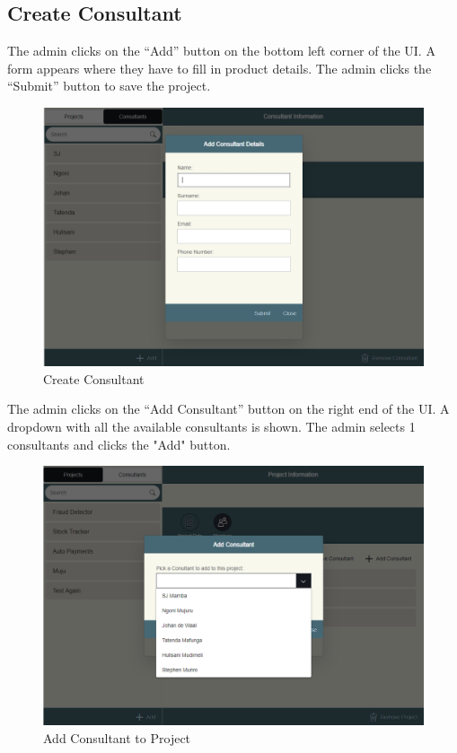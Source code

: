 \documentclass[a4paper, 12pt, oneside]{article}
\begin{document}
\subsection{Create Consultant}

The admin clicks on the “Add” button on the bottom left corner of the UI. A form appears where they have to fill in product details. The admin clicks the “Submit” button to save the project.

\begin{figure}[h]

  \centering

  \includegraphics[width=\linewidth]{images/createConsultant.PNG}

  \caption{Create Consultant}

  \label{fig:sfig1}

\end{figure}


The admin clicks on the “Add Consultant” button on the right end of the UI. A dropdown with all the available consultants is shown. The admin selects 1 consultants and clicks the "Add" button.

\begin{figure}[h]

  \centering

  \includegraphics[width=\linewidth]{images/addConsultant.PNG}

  \caption{Add Consultant to Project}

  \label{fig:sfig1}

\end{figure}
\end{document}

